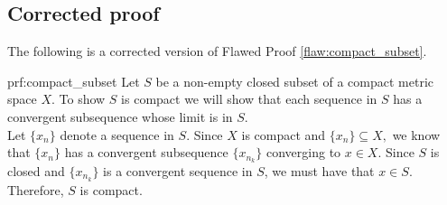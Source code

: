 \clearpage
\subsection{Corrected proof}

The following is a corrected version of Flawed Proof \ref{flaw:compact_subset}. %

\begin{prf}{prf:compact_subset} %
Let $S$ be a non-empty closed subset of a compact metric space $X$. To show $S$ is compact we will show that each sequence in $S$ has a convergent subsequence whose limit is in $S$. \\

Let $\{x_n\}$ denote a sequence in $S$. Since $X$ is compact and $\{x_n\} \subseteq X,$ we know that $\{x_n\}$ has a convergent subsequence $\{x_{n_k}\}$ converging to $x \in X$. Since $S$ is closed and $\{x_{n_k}\}$ is a convergent sequence in $S$, we must have that $x\in S$. Therefore, $S$ is compact.
\end{prf} 